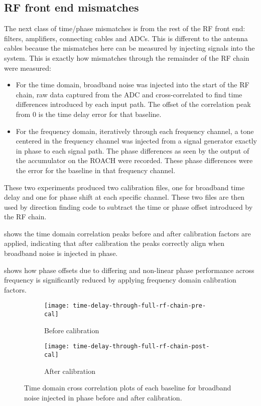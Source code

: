 \subsection{RF front end mismatches}
The next class of time/phase mismatches is from the rest of the RF front end: filters, amplifiers, connecting cables and ADCs. This is different to the antenna cables because the mismatches here can be measured by injecting signals into the system. This is exactly how mismatches through the remainder of the RF chain were measured:
\begin{itemize}
  \item For the time domain, broadband noise was injected into the start of the RF chain, raw data captured from the ADC and cross-correlated to find time differences introduced by each input path. The offset of the correlation peak from 0 is the time delay error for that baseline.
  \item For the frequency domain, iteratively through each frequency channel, a tone centered in the frequency channel was injected from a signal generator exactly in phase to each signal path. The phase differences as seen by the output of the accumulator on the ROACH were recorded. These phase differences were the error for the baseline in that frequency channel.
\end{itemize}

These two experiments produced two calibration files, one for broadband time delay and one for phase shift at each specific channel. These two files are then used by direction finding code to subtract the time or phase offset introduced by the RF chain.

 shows the time domain correlation peaks before and after calibration factors are applied, indicating that after calibration the peaks correctly align when broadband noise is injected in phase.

 shows how phase offsets due to differing and non-linear phase performance across frequency is significantly reduced by applying frequency domain calibration factors.

\begin{figure}
  \centering
  \begin{subfigure}[b]{0.49\textwidth}
    \centering
    \texttt{[image: time-delay-through-full-rf-chain-pre-cal]}
    \caption{Before calibration}
  \end{subfigure}
  \begin{subfigure}[b]{0.49\textwidth}
    \centering
    \texttt{[image: time-delay-through-full-rf-chain-post-cal]}
    \caption{After calibration}
  \end{subfigure}
  \caption{Time domain cross correlation plots of each baseline for broadband noise injected in phase before and after calibration.}
  \label{fig:software:time-domain-cal-graphs}
\end{figure}

